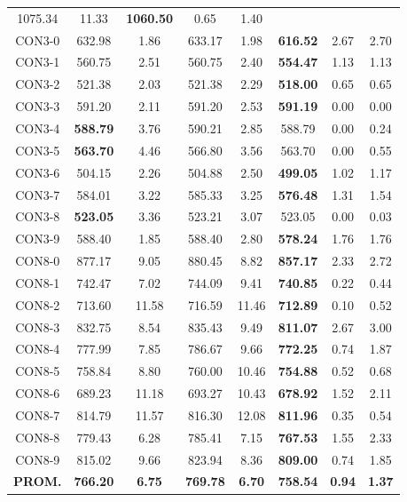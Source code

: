 \begin{table}[h]
\begin{tabular}{c c c c c c c c}
1075.34 & 11.33 & \bf{1060.50} & 
0.65 & 1.40\\CON3-0 & 632.98 & 1.86 & 
633.17 & 1.98 & \bf{616.52} & 
2.67 & 2.70\\CON3-1 & 560.75 & 2.51 & 
560.75 & 2.40 & \bf{554.47} & 
1.13 & 1.13\\CON3-2 & 521.38 & 2.03 & 
521.38 & 2.29 & \bf{518.00} & 
0.65 & 0.65\\CON3-3 & 591.20 & 2.11 & 
591.20 & 2.53 & \bf{591.19} & 
0.00 & 0.00\\CON3-4 & \bf{588.79} & 3.76 & 
590.21 & 2.85 & 588.79 & 0.00
 & 0.24\\CON3-5 & \bf{563.70} & 4.46 & 
566.80 & 3.56 & 563.70 & 0.00
 & 0.55\\CON3-6 & 504.15 & 2.26 & 
504.88 & 2.50 & \bf{499.05} & 
1.02 & 1.17\\CON3-7 & 584.01 & 3.22 & 
585.33 & 3.25 & \bf{576.48} & 
1.31 & 1.54\\CON3-8 & \bf{523.05} & 3.36 & 
523.21 & 3.07 & 523.05 & 0.00
 & 0.03\\CON3-9 & 588.40 & 1.85 & 
588.40 & 2.80 & \bf{578.24} & 
1.76 & 1.76\\CON8-0 & 877.17 & 9.05 & 
880.45 & 8.82 & \bf{857.17} & 
2.33 & 2.72\\CON8-1 & 742.47 & 7.02 & 
744.09 & 9.41 & \bf{740.85} & 
0.22 & 0.44\\CON8-2 & 713.60 & 11.58 & 
716.59 & 11.46 & \bf{712.89} & 
0.10 & 0.52\\CON8-3 & 832.75 & 8.54 & 
835.43 & 9.49 & \bf{811.07} & 
2.67 & 3.00\\CON8-4 & 777.99 & 7.85 & 
786.67 & 9.66 & \bf{772.25} & 
0.74 & 1.87\\CON8-5 & 758.84 & 8.80 & 
760.00 & 10.46 & \bf{754.88} & 
0.52 & 0.68\\CON8-6 & 689.23 & 11.18 & 
693.27 & 10.43 & \bf{678.92} & 
1.52 & 2.11\\CON8-7 & 814.79 & 11.57 & 
816.30 & 12.08 & \bf{811.96} & 
0.35 & 0.54\\CON8-8 & 779.43 & 6.28 & 
785.41 & 7.15 & \bf{767.53} & 
1.55 & 2.33\\CON8-9 & 815.02 & 9.66 & 
823.94 & 8.36 & \bf{809.00} & 
0.74 & 1.85\\\bf{PROM.} & 
\bf{766.20} & \bf{6.75} & \bf{769.78} & \bf{6.70} & \bf{758.54} & \bf{0.94} & \bf{1.37}\\[1ex]\hline
\end{tabular}
\label{table:SS-M-50-1.0}
\end{table}

